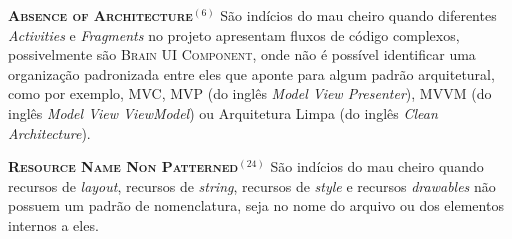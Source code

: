 


  \noindent
  \textsc{\textbf{{\small Absence of Architecture}}}$^{(6)}$ São indícios do mau cheiro quando diferentes \textit{Activities} e \textit{Fragments} no projeto apresentam fluxos de código complexos, possivelmente são \textsc{\small Brain UI Component}, onde não é possível identificar uma organização padronizada entre eles que aponte para algum padrão arquitetural, como por exemplo, MVC, MVP (do inglês \textit{Model View Presenter}), MVVM (do inglês \textit{Model View ViewModel}) ou Arquitetura Limpa (do inglês \textit{Clean Architecture}).



  \noindent
  \textbf{\textsc{{\small Resource Name Non Patterned}}}$^{(24)}$
      São indícios do mau cheiro quando recursos de \textit{layout}, recursos de \textit{string}, recursos de \textit{style} e recursos \textit{drawables} não possuem um padrão de nomenclatura, seja no nome do arquivo ou dos elementos internos a eles.



